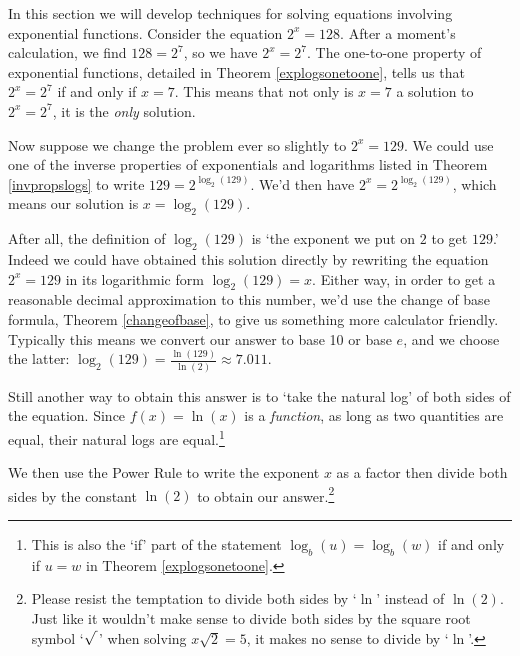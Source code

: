 \documentclass{ximera}
\begin{document}
	\author{Stitz-Zeager}




\setcounter{footnote}{0}

\label{ExponentialEquationsandInequalities}

In this section we will develop techniques for solving equations involving exponential functions.  Consider the equation $2^{x} = 128$.  After a moment's calculation, we find $128 = 2^{7}$, so we have $2^{x} = 2^{7}$.  The one-to-one property of exponential functions, detailed in Theorem \ref{explogsonetoone}, tells us that $2^{x} = 2^{7}$ if and only if $x=7$.  This means that not only is $x=7$ a solution to $2^{x} = 2^{7}$, it is the \textit{only} solution.  



Now suppose we change the problem ever so slightly to $2^{x} = 129$.  We could use one of the inverse properties of exponentials and logarithms listed in Theorem \ref{invpropslogs} to write $129 = 2^{\log_{2}(129)}$.  We'd then have $2^{x} = 2^{\log_{2}(129)}$, which means our solution is $x = \log_{2}(129)$. 



After all, the definition of $\log_{2}(129)$ is `the exponent we put on $2$ to get $129$.' Indeed we could have obtained this solution directly by rewriting the equation $2^{x} = 129$ in its logarithmic form $\log_{2}(129) = x$.  Either way, in order to get a reasonable decimal approximation to this number, we'd use the change of base formula, Theorem \ref{changeofbase}, to give us something more calculator friendly.  Typically this means we convert our answer to base 10 or base $e$, and we choose the latter: $\log_{2}(129) = \frac{\ln(129)}{\ln(2)} \approx 7.011$.  



Still another way to obtain this answer is to `take the natural log' of both sides of the equation. Since $f(x) = \ln(x)$ is a \textit{function}, as long as two quantities are equal, their natural logs are equal.\footnote{This is also the `if' part of the statement $\log_{b}(u) = \log_{b}(w)$ if and only if $u=w$ in Theorem \ref{explogsonetoone}.} 



We then use the Power Rule to write the exponent $x$ as a factor then divide both sides by the constant $\ln(2)$ to obtain our answer.\footnote{ Please resist the temptation to divide both sides by `$\ln$' instead of $\ln(2)$.   Just like it wouldn't make sense to divide both sides by the square root symbol `$\sqrt{\vphantom{2} \,}$' when solving $x \sqrt{2} = 5$, it makes no sense to divide by `$\ln$'.}
\end{document}
